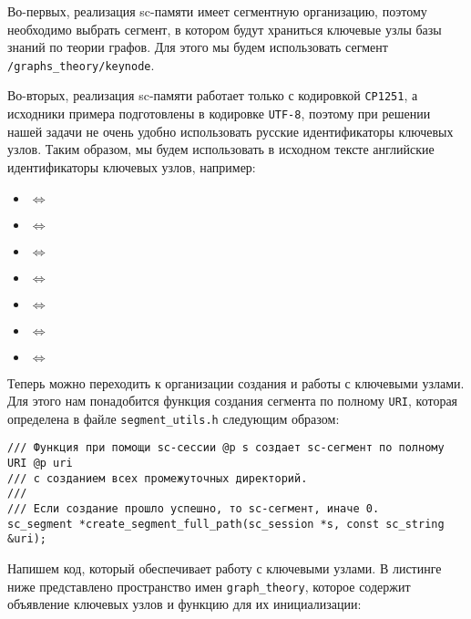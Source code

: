 Во-первых, реализация sc-памяти имеет сегментную организацию, поэтому
необходимо выбрать сегмент, в котором будут храниться ключевые узлы
базы знаний по теории графов. Для этого мы будем использовать сегмент
\verb|/graphs_theory/keynode|.

Во-вторых, реализация sc-памяти работает только с кодировкой
\verb|CP1251|, а исходники примера подготовлены в кодировке
\verb|UTF-8|, поэтому при решении нашей задачи не очень удобно
использовать русские идентификаторы ключевых узлов. Таким образом, мы
будем использовать в исходном тексте английские идентификаторы
ключевых узлов, например:

\begin{itemize}
\item {} $\Leftrightarrow$ 
\item {} $\Leftrightarrow$ 
\item {} $\Leftrightarrow$ 
\item {} $\Leftrightarrow$ 
\item {} $\Leftrightarrow$ 
\item {} $\Leftrightarrow$ 
\item {} $\Leftrightarrow$ 
\end{itemize}

Теперь можно переходить к организации создания и работы с ключевыми
узлами. Для этого нам понадобится функция создания сегмента по полному
\verb|URI|, которая определена в файле \verb|segment_utils.h|
следующим образом:

\begin{lstlisting}[texcl]
/// Функция при помощи sc-сессии @p s создает sc-сегмент по полному URI @p uri
/// c созданием всех промежуточных директорий.
///
/// Если создание прошло успешно, то sc-сегмент, иначе 0.
sc_segment *create_segment_full_path(sc_session *s, const sc_string &uri);
\end{lstlisting}

Напишем код, который обеспечивает работу с ключевыми
узлами. В листинге ниже представлено пространство имен
\lstinline|graph_theory|, которое содержит объявление ключевых узлов и
функцию для их инициализации:


